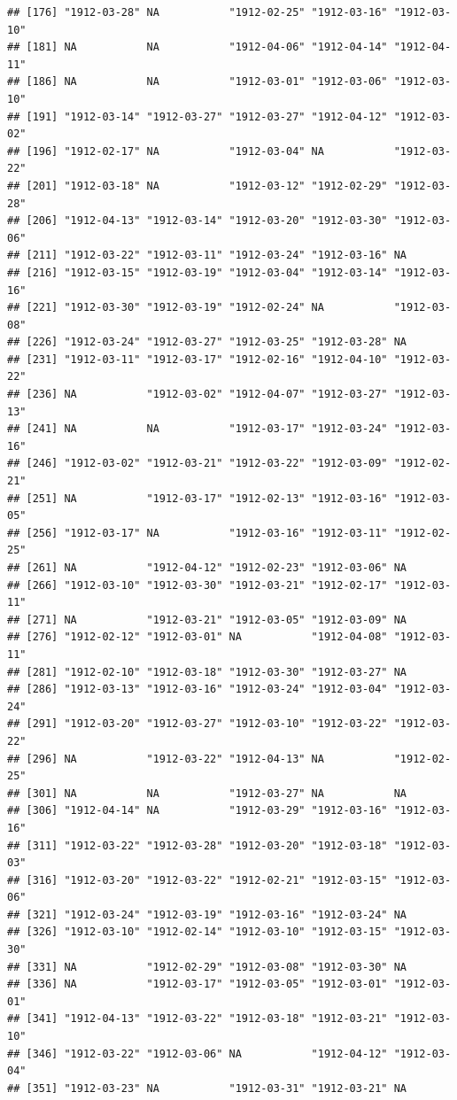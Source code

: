 \documentclass[11pt,]{book}
\begin{document}
\begin{verbatim}
## [176] "1912-03-28" NA           "1912-02-25" "1912-03-16" "1912-03-10"
## [181] NA           NA           "1912-04-06" "1912-04-14" "1912-04-11"
## [186] NA           NA           "1912-03-01" "1912-03-06" "1912-03-10"
## [191] "1912-03-14" "1912-03-27" "1912-03-27" "1912-04-12" "1912-03-02"
## [196] "1912-02-17" NA           "1912-03-04" NA           "1912-03-22"
## [201] "1912-03-18" NA           "1912-03-12" "1912-02-29" "1912-03-28"
## [206] "1912-04-13" "1912-03-14" "1912-03-20" "1912-03-30" "1912-03-06"
## [211] "1912-03-22" "1912-03-11" "1912-03-24" "1912-03-16" NA          
## [216] "1912-03-15" "1912-03-19" "1912-03-04" "1912-03-14" "1912-03-16"
## [221] "1912-03-30" "1912-03-19" "1912-02-24" NA           "1912-03-08"
## [226] "1912-03-24" "1912-03-27" "1912-03-25" "1912-03-28" NA          
## [231] "1912-03-11" "1912-03-17" "1912-02-16" "1912-04-10" "1912-03-22"
## [236] NA           "1912-03-02" "1912-04-07" "1912-03-27" "1912-03-13"
## [241] NA           NA           "1912-03-17" "1912-03-24" "1912-03-16"
## [246] "1912-03-02" "1912-03-21" "1912-03-22" "1912-03-09" "1912-02-21"
## [251] NA           "1912-03-17" "1912-02-13" "1912-03-16" "1912-03-05"
## [256] "1912-03-17" NA           "1912-03-16" "1912-03-11" "1912-02-25"
## [261] NA           "1912-04-12" "1912-02-23" "1912-03-06" NA          
## [266] "1912-03-10" "1912-03-30" "1912-03-21" "1912-02-17" "1912-03-11"
## [271] NA           "1912-03-21" "1912-03-05" "1912-03-09" NA          
## [276] "1912-02-12" "1912-03-01" NA           "1912-04-08" "1912-03-11"
## [281] "1912-02-10" "1912-03-18" "1912-03-30" "1912-03-27" NA          
## [286] "1912-03-13" "1912-03-16" "1912-03-24" "1912-03-04" "1912-03-24"
## [291] "1912-03-20" "1912-03-27" "1912-03-10" "1912-03-22" "1912-03-22"
## [296] NA           "1912-03-22" "1912-04-13" NA           "1912-02-25"
## [301] NA           NA           "1912-03-27" NA           NA          
## [306] "1912-04-14" NA           "1912-03-29" "1912-03-16" "1912-03-16"
## [311] "1912-03-22" "1912-03-28" "1912-03-20" "1912-03-18" "1912-03-03"
## [316] "1912-03-20" "1912-03-22" "1912-02-21" "1912-03-15" "1912-03-06"
## [321] "1912-03-24" "1912-03-19" "1912-03-16" "1912-03-24" NA          
## [326] "1912-03-10" "1912-02-14" "1912-03-10" "1912-03-15" "1912-03-30"
## [331] NA           "1912-02-29" "1912-03-08" "1912-03-30" NA          
## [336] NA           "1912-03-17" "1912-03-05" "1912-03-01" "1912-03-01"
## [341] "1912-04-13" "1912-03-22" "1912-03-18" "1912-03-21" "1912-03-10"
## [346] "1912-03-22" "1912-03-06" NA           "1912-04-12" "1912-03-04"
## [351] "1912-03-23" NA           "1912-03-31" "1912-03-21" NA          

\end{verbatim}
\end{document}
